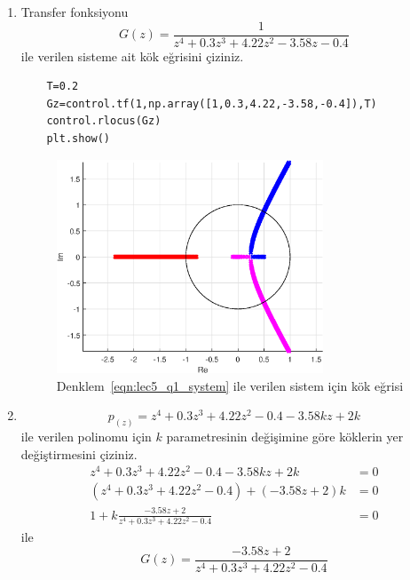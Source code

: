 \begin{enumerate}
    \item Transfer fonksiyonu
    \begin{equation}
        G(z)=\frac{1}{z^4+0.3z^3+4.22z^2-3.58z-0.4}\label{eqn:lec5_q1_system}
    \end{equation}
    ile verilen sisteme ait kök eğrisini çiziniz.
    \begin{lstlisting}
    T=0.2
    Gz=control.tf(1,np.array([1,0.3,4.22,-3.58,-0.4]),T)
    control.rlocus(Gz)
    plt.show()
    \end{lstlisting}
    \begin{figure}[!htb]
        \centering
        \includegraphics[width=0.75\textwidth]{img/lec5_rlocus1}
        \caption{Denklem~\ref{eqn:lec5_q1_system} ile verilen sistem için kök eğrisi}
        \label{fig:lec5_rlocus1}
    \end{figure}
    \item 
    \begin{equation}
        p_(z)=z^4+0.3z^3+4.22z^2-0.4-3.58kz+2k\label{eqn:lec5_q2_polinom}
    \end{equation}
    ile verilen polinomu için $k$ parametresinin değişimine göre köklerin yer değiştirmesini çiziniz.
    \begin{equation}
    \begin{split}
        z^4+0.3z^3+4.22z^2-0.4-3.58kz+2k&=0\\
        (z^4+0.3z^3+4.22z^2-0.4)+(-3.58z+2)k&=0\\
        1+k\frac{-3.58z+2}{z^4+0.3z^3+4.22z^2-0.4}&=0
    \end{split}
    \end{equation}
    ile
    \begin{equation}
        G(z)=\frac{-3.58z+2}{z^4+0.3z^3+4.22z^2-0.4}\label{eqn:lec5_rlocus2_system}

\end{equation}
\end{enumerate}
